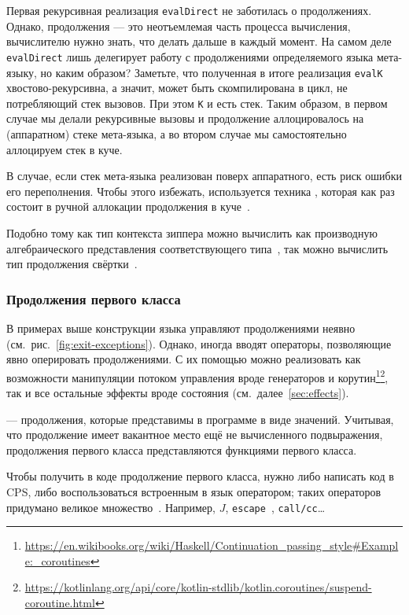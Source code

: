 Первая рекурсивная реализация \texttt{evalDirect} не заботилась о продолжениях.
Однако, продолжения --- это неотъемлемая часть процесса вычисления, вычислителю нужно знать, что делать дальше в каждый момент.
На самом деле \texttt{evalDirect} лишь делегирует работу с продолжениями определяемого языка мета-языку, но каким образом?
Заметьте, что полученная в итоге реализация \texttt{evalK} хвостово-рекурсивна, а значит, может быть скомпилирована в цикл, не потребляющий стек вызовов. При этом \texttt{K} и есть стек.
Таким образом, в первом случае мы делали рекурсивные вызовы и продолжение аллоцировалось на (аппаратном) стеке мета-языка, а во втором случае мы самостоятельно аллоцируем стек в куче.

В случае, если стек мета-языка реализован поверх аппаратного, есть риск ошибки его переполнения.
Чтобы этого избежать, используется техника , которая как раз состоит в ручной аллокации продолжения в куче~\cite{ganz1999trampolined, bjarnarson2012stackless}.

Подобно тому как тип контекста зиппера можно вычислить как производную алгебраического представления соответствующего типа~\cite{huet1997zipper, mcbride2001derivative, abbott2003derivatives}, так можно вычислить тип продолжения свёртки~\cite{mcbride2008clowns}.

\subsubsection{Продолжения первого класса} \label{subsubsec:first-class-cont}

В примерах выше конструкции языка управляют продолжениями неявно (см.\ рис.\ \ref{fig:exit-exceptions}).
Однако, иногда вводят операторы, позволяющие явно оперировать продолжениями.
С их помощью можно реализовать как возможности манипуляции потоком управления вроде генераторов и корутин\footnote{\url{https://en.wikibooks.org/wiki/Haskell/Continuation_passing_style\#Example:_coroutines}}\footnote{\url{https://kotlinlang.org/api/core/kotlin-stdlib/kotlin.coroutines/suspend-coroutine.html}}, так и все остальные эффекты вроде состояния (см.\ далее\ \ref{sec:effects}).

 --- продолжения, которые представимы в программе в виде значений.
Учитывая, что продолжение имеет вакантное место ещё не вычисленного подвыражения, продолжения первого класса представляются функциями первого класса.

Чтобы получить в коде продолжение первого класса, нужно либо написать код в CPS, либо воспользоваться встроенным в язык оператором; таких операторов придумано великое множество~\cite[приложение A]{hillerstrom2022foundations}.
Например, $J$, \texttt{escape}~\cite{reynolds1972definitional}, \texttt{call/cc}\ldots

